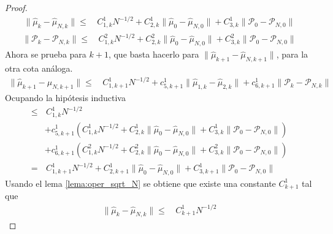 \begin{proof}
	\begin{equation*}
		\begin{aligned}
			\| \hat \mu_{k} - \hat \mu_{N,k}  \| \leq & \, C_{1,k}^1 N^{-1/2} + C_{2,k}^1 \| \hat \mu_{0} - \hat \mu_{N, 0} \| + C_{3,k}^1 \| \mathcal{P}_{0}  - \mathcal{P}_{N, 0}  \|
		\end{aligned}
	\end{equation*}
	\begin{equation*}
		\begin{aligned}
			\| \mathcal{P}_{k} - \mathcal{P}_{N,k}  \| \leq & \, C_{1,k}^2 N^{-1/2} + C_{2,k}^2 \| \hat \mu_{0} - \hat \mu_{N, 0} \| + C_{3,k}^2 \| \mathcal{P}_{0} - \mathcal{P}_{N, 0} \|
		\end{aligned}
	\end{equation*}
	Ahora se prueba para $k+1$, que basta hacerlo para $\| \hat \mu_{k+1} - \hat \mu_{N,k+1}  \|$, para la otra cota análoga.
	\begin{equation*}
	\begin{aligned}
		\| \hat \mu_{k+1} - \hat \mu_{N,k+1}  \| \leq & \, C_{1,k+1}^1 N^{-1/2} + c_{5,k+1}^1 \| \hat \mu_{1, k} - \hat \mu_{2, k} \| + c_{6,k+1}^1 \| \mathcal{P}_{k}  - \mathcal{P}_{N, k}  \| 
	\end{aligned}
	\end{equation*}
	Ocupando la hipótesis inductiva
	\begin{equation*}
	\begin{aligned}
		\leq & \, C_{1,k}^1 N^{-1/2} \\
		& + c_{5,k+1}^1 (C_{1,k}^1 N^{-1/2} + C_{2,k}^1 \| \hat \mu_{0} - \hat \mu_{N, 0} \| + C_{3,k}^1 \| \mathcal{P}_{0}  - \mathcal{P}_{N, 0}  \|) \\
		& + c_{6,k+1}^1 (C_{1,k}^2 N^{-1/2} + C_{2,k}^2 \| \hat \mu_{0} - \hat \mu_{N, 0} \| + C_{3,k}^2 \| \mathcal{P}_{0} - \mathcal{P}_{N, 0} \|) \\
		= & \, C_{1,k+1}^1 N^{-1/2} + C_{2,k+1}^1 \| \hat \mu_{0} - \hat \mu_{N, 0} \| + C_{3,k+1}^1 \| \mathcal{P}_{0} - \mathcal{P}_{N, 0} \|
	\end{aligned}
	\end{equation*}
	Usando el lema \ref{lema:oper_sqrt_N} se obtiene que existe una constante $C_{k+1}^1$ tal que
	\begin{equation*}
		\begin{aligned}
			\| \hat \mu_{k} - \hat \mu_{N,k}  \| \leq & \, C_{k+1}^1 N^{-1/2}
		\end{aligned}
	\end{equation*}
\end{proof}
